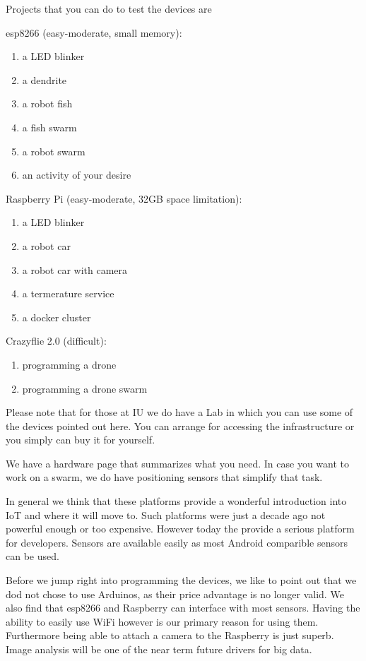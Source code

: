 Projects that you can do to test the devices are

esp8266 (easy-moderate, small memory):

\begin{enumerate}
\def\labelenumi{\arabic{enumi}.}
\tightlist
\item
  a LED blinker
\item
  a dendrite
\item
  a robot fish
\item
  a fish swarm
\item
  a robot swarm
\item
  an activity of your desire
\end{enumerate}

Raspberry Pi (easy-moderate, 32GB space limitation):

\begin{enumerate}
\def\labelenumi{\arabic{enumi}.}
\tightlist
\item
  a LED blinker
\item
  a robot car
\item
  a robot car with camera
\item
  a termerature service
\item
  a docker cluster
\end{enumerate}

Crazyflie 2.0 (difficult):

\begin{enumerate}
\def\labelenumi{\arabic{enumi}.}
\tightlist
\item
  programming a drone
\item
  programming a drone swarm
\end{enumerate}

Please note that for those at IU we do have a Lab in which you can use
some of the devices pointed out here. You can arrange for accessing the
infrastructure or you simply can buy it for yourself.

We have a hardware page that summarizes what you need. In case you want
to work on a swarm, we do have positioning sensors that simplify that
task.

In general we think that these platforms provide a wonderful
introduction into IoT and where it will move to. Such platforms were
just a decade ago not powerful enough or too expensive. However today
the provide a serious platform for developers. Sensors are available
easily as most Android comparible sensors can be used.

Before we jump right into programming the devices, we like to point out
that we dod not chose to use Arduinos, as their price advantage is no
longer valid. We also find that esp8266 and Raspberry can interface with
most sensors. Having the ability to easily use WiFi however is our
primary reason for using them. Furthermore being able to attach a camera
to the Raspberry is just superb. Image analysis will be one of the near
term future drivers for big data.
